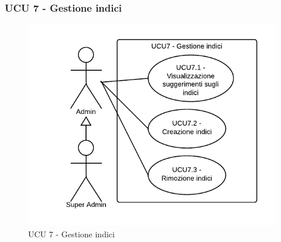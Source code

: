 \subsubsection{UCU 7 - Gestione indici}    
    \begin{figure}[H]
      \begin{center}
      \includegraphics[width=12cm]{UML/UCU 7 - Gestione indici.png}
      \caption{UCU 7 - Gestione indici}
      \end{center} 
    \end{figure}    
    
